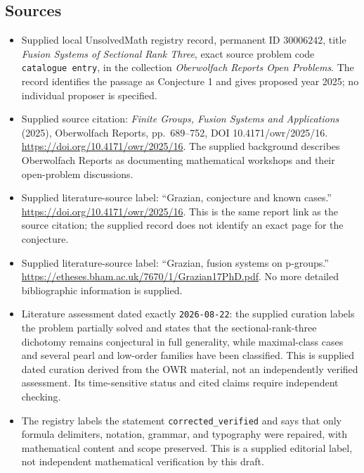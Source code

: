 \documentclass[11pt]{article}
\begin{document}
\subsection{Sources}
\begin{itemize}
\item Supplied local UnsolvedMath registry record, permanent ID \(30006242\), title \emph{Fusion Systems of Sectional Rank Three}, exact source problem code \texttt{catalogue entry}, in the collection \emph{Oberwolfach Reports Open Problems}. The record identifies the passage as Conjecture 1 and gives proposed year 2025; no individual proposer is specified.
\item Supplied source citation: \emph{Finite Groups, Fusion Systems and Applications} (2025), Oberwolfach Reports, pp.\ 689--752, DOI 10.4171/owr/2025/16. \url{https://doi.org/10.4171/owr/2025/16}. The supplied background describes Oberwolfach Reports as documenting mathematical workshops and their open-problem discussions.
\item Supplied literature-source label: ``Grazian, conjecture and known cases.'' \url{https://doi.org/10.4171/owr/2025/16}. This is the same report link as the source citation; the supplied record does not identify an exact page for the conjecture.
\item Supplied literature-source label: ``Grazian, fusion systems on p-groups.'' \url{https://etheses.bham.ac.uk/7670/1/Grazian17PhD.pdf}. No more detailed bibliographic information is supplied.
\item Literature assessment dated exactly \texttt{2026-08-22}: the supplied curation labels the problem partially solved and states that the sectional-rank-three dichotomy remains conjectural in full generality, while maximal-class cases and several pearl and low-order families have been classified. This is supplied dated curation derived from the OWR material, not an independently verified assessment. Its time-sensitive status and cited claims require independent checking.
\item The registry labels the statement \texttt{corrected\_verified} and says that only formula delimiters, notation, grammar, and typography were repaired, with mathematical content and scope preserved. This is a supplied editorial label, not independent mathematical verification by this draft.
\end{itemize}
\end{document}
